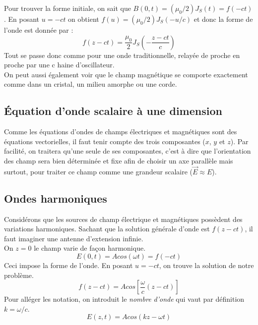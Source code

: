 \documentclass	[11pt, a4paper, openany]{book}
\begin{document}
Pour trouver la forme initiale, on sait que $B(0,t) = (\mu_0/2)J_S(t) = f(-ct)$. En posant $u = -ct$ on obtient $f(u) = (\mu_0/2)J_S(-u/c)$ et donc la forme de l'onde est donnée par : 
\begin{equation}
f(z - ct) = \frac{\mu_0}{2}J_S\left(-\frac{z - ct}{c}\right)
\end{equation}
Tout se passe donc comme pour une onde traditionnelle, relayée de proche en proche par une c haine d'oscillateur.\\

On peut aussi également voir que le champ magnétique se comporte exactement comme dans un cristal, un milieu amorphe ou une corde.

\subsection{Équation d'onde scalaire à une dimension}
Comme les équations d'ondes de champs électriques et magnétiques sont des équations vectorielles, il faut tenir compte des trois composantes ($x$, $y$ et $z$). Par facilité, on traitera qu'une seule de ses composantes, c'est à dire que l'orientation des champ sera bien déterminée et fixe afin de choisir un axe parallèle mais surtout, pour traiter ce champ comme une grandeur scalaire ($\vec{E} \approx E$).

\subsection{Ondes harmoniques}
Considérons que les sources de champ électrique et magnétiques possèdent des variations harmoniques. Sachant que la solution générale d'onde est $f(z - ct)$, il faut imaginer une antenne d'extension infinie. \\
On $z = 0$ le champ varie de façon harmonique.
\begin{equation}
E(0,t) = Acos(\omega t) = f(-ct)
\end{equation}
Ceci impose la forme de l'onde. En posant $u = -ct$, on trouve la solution de notre problème.
\begin{equation}
f(z - ct) = Acos\left[\frac{\omega}{c}\left(z - ct\right)\right]
\end{equation}
Pour alléger les notation, on introduit le \textit{nombre d'onde} qui vaut par définition $k = \omega / c$.
\begin{equation}
E(z,t) = Acos(kz - \omega t)
\end{equation}
\end{document}
